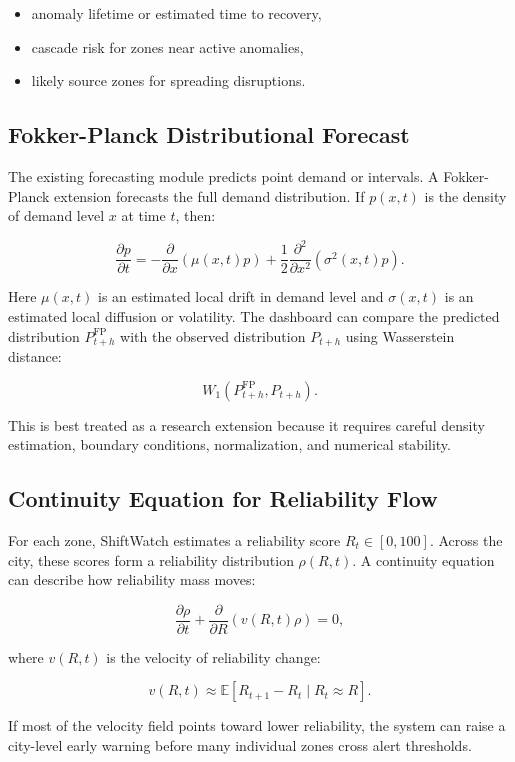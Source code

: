 \documentclass[11pt]{article}
\begin{document}
\begin{itemize}
    \item anomaly lifetime or estimated time to recovery,
    \item cascade risk for zones near active anomalies,
    \item likely source zones for spreading disruptions.
\end{itemize}

\subsection{Fokker-Planck Distributional Forecast}

The existing forecasting module predicts point demand or intervals. A Fokker-Planck extension forecasts the full demand distribution. If $p(x,t)$ is the density of demand level $x$ at time $t$, then:

\[
    \frac{\partial p}{\partial t}
    =
    -\frac{\partial}{\partial x}(\mu(x,t)p)
    + \frac{1}{2}\frac{\partial^2}{\partial x^2}(\sigma^2(x,t)p).
\]

Here $\mu(x,t)$ is an estimated local drift in demand level and $\sigma(x,t)$ is an estimated local diffusion or volatility. The dashboard can compare the predicted distribution $P_{t+h}^{\mathrm{FP}}$ with the observed distribution $P_{t+h}$ using Wasserstein distance:

\[
    W_1(P_{t+h}^{\mathrm{FP}}, P_{t+h}).
\]

This is best treated as a research extension because it requires careful density estimation, boundary conditions, normalization, and numerical stability.

\subsection{Continuity Equation for Reliability Flow}

For each zone, ShiftWatch estimates a reliability score $R_t \in [0,100]$. Across the city, these scores form a reliability distribution $\rho(R,t)$. A continuity equation can describe how reliability mass moves:

\[
    \frac{\partial \rho}{\partial t}
    + \frac{\partial}{\partial R}(v(R,t)\rho) = 0,
\]

where $v(R,t)$ is the velocity of reliability change:

\[
    v(R,t) \approx \mathbb{E}[R_{t+1} - R_t \mid R_t \approx R].
\]

If most of the velocity field points toward lower reliability, the system can raise a city-level early warning before many individual zones cross alert thresholds.
\end{document}

